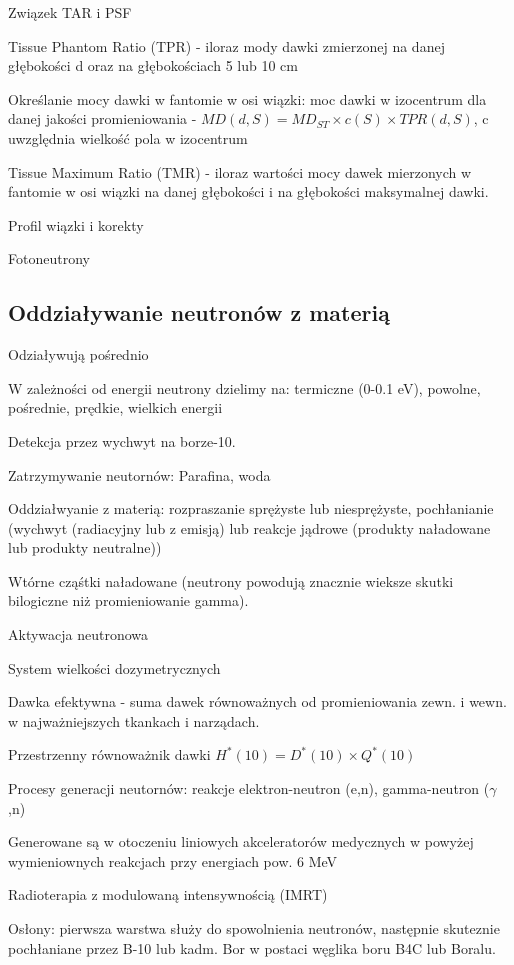 \documentclass{article}
\begin{document}
Związek TAR i PSF

Tissue Phantom Ratio (TPR) - iloraz mody dawki zmierzonej na danej głębokości d oraz na głębokościach 5 lub 10 cm

Określanie mocy dawki w fantomie w osi wiązki: moc dawki w izocentrum dla danej jakości promieniowania - $MD(d,S) = MD_{ST} \times c(S) \times TPR(d,S)$, c uwzględnia wielkość pola w izocentrum

Tissue Maximum Ratio (TMR) - iloraz wartości mocy dawek mierzonych w fantomie w osi wiązki na danej głębokości i na głębokości maksymalnej dawki.

Profil wiązki i korekty

Fotoneutrony

\subsection{Oddziaływanie neutronów z materią}

Odziaływują pośrednio

W zależności od energii neutrony dzielimy na: termiczne (0-0.1 eV), powolne, pośrednie, prędkie, wielkich energii

Detekcja przez wychwyt na borze-10.

Zatrzymywanie neutornów:
Parafina, woda

Oddziałwyanie z materią: rozpraszanie sprężyste lub niesprężyste, pochłanianie (wychwyt (radiacyjny lub z emisją) lub reakcje jądrowe (produkty naładowane lub produkty neutralne))

Wtórne cząśtki naładowane (neutrony powodują znacznie wieksze skutki bilogiczne niż promieniowanie gamma).

Aktywacja neutronowa

System wielkości dozymetrycznych

Dawka efektywna - suma dawek równoważnych od promieniowania zewn. i wewn. w najważniejszych tkankach i narządach.

Przestrzenny równoważnik dawki $H^*(10) = D^*(10) \times Q^*(10)$

Procesy generacji neutornów: reakcje elektron-neutron (e,n), gamma-neutron ($\gamma$,n)

Generowane są w otoczeniu liniowych akceleratorów medycznych w powyżej wymieniownych reakcjach przy energiach pow. 6 MeV

Radioterapia z modulowaną intensywnością (IMRT)

Osłony: pierwsza warstwa służy do spowolnienia neutronów, następnie skuteznie pochłaniane przez B-10 lub kadm. Bor w postaci węglika boru B4C lub Boralu.
\end{document}

